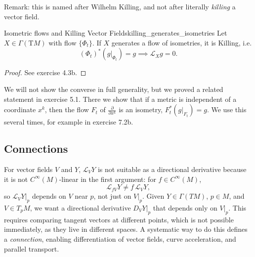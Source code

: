 Remark: this is named after Wilhelm Killing, and not after literally \emph{killing} a vector field.\\



\begin{colorlem}{Isometric flows and Killing Vector Fields}{killing_generates_isometries}
Let $X \in \Gamma(\mathrm{T}M)$ with flow $\{\Phi_t\}$. If $X$ generates a flow of isometries, it is Killing, i.e.
$$(\Phi_t)^* (g|_{\Phi_t}) = g\implies \mathcal{L}_X g = 0.$$
\end{colorlem}
\begin{proof}
See exercise 4.3b.
\end{proof}

We will not show the converse in full generality, but we proved a related statement in exercise 5.1. There we show that if a metric is independent of a coordinate $x^k$, then the flow $F_t$ of $\frac{\partial}{\partial x^k}$ is an isometry, $F^*_t(g|_{F_t}) = g$. We use this several times, for example in exercise 7.2b.





\subsection{Connections}




For vector fields $V$ and $Y$, $\mathcal{L}_V Y$ is not suitable as a directional derivative because it is not $C^\infty(M)$-linear in the first argument: for $f \in C^\infty(M)$,
\[
\mathcal{L}_{fV} Y \neq f\,\mathcal{L}_V Y ,
\]
so $\mathcal{L}_V Y|_p$ depends on $V$ near $p$, not just on $V|_p$. Given $Y \in \Gamma(TM)$, $p \in M$, and $V \in T_pM$, we want a directional derivative $D_V Y|_p$ that depends only on $V|_p$. This requires comparing tangent vectors at different points, which is not possible immediately, as they live in different spaces. A systematic way to do this defines a \emph{connection}, enabling differentiation of vector fields, curve acceleration, and parallel transport.




